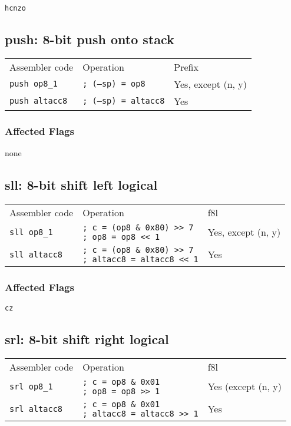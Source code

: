 \documentclass{book}
\begin{document}
\texttt{hcnzo}


\subsection{push: 8-bit push onto stack}

\begin{tabular}{l l l}
Assembler code        & Operation                   & Prefix \\
\texttt{push op8\_1}  & \texttt{; (--sp) = op8}     & Yes, except (n, y) \\
\texttt{push altacc8} & \texttt{; (--sp) = altacc8} & Yes
\end{tabular}

\subsubsection*{Affected Flags}

none


\subsection{sll: 8-bit shift left logical}

\begin{tabular}{l l l}
Assembler code       & Operation                                                                       & f8l \\
\texttt{sll op8\_1}  & \makecell{\texttt{; c = (op8 \& 0x80) >> 7}\\\texttt{; op8 = op8 << 1}}         & Yes, except (n, y) \\
\texttt{sll altacc8} & \makecell{\texttt{; c = (op8 \& 0x80) >> 7}\\\texttt{; altacc8 = altacc8 << 1}} & Yes
\end{tabular}

\subsubsection*{Affected Flags}

\texttt{cz}


\subsection{srl: 8-bit shift right logical}

\begin{tabular}{l l l}
Assembler code       & Operation                                                                & f8l \\
\texttt{srl op8\_1}  & \makecell{\texttt{; c = op8 \& 0x01}\\\texttt{; op8 = op8 >> 1}}         & Yes (except (n, y) \\
\texttt{srl altacc8} & \makecell{\texttt{; c = op8 \& 0x01}\\\texttt{; altacc8 = altacc8 >> 1}} & Yes
\end{tabular}
\end{document}
